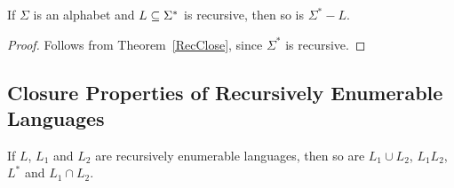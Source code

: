 \begin{corollary}
\label{RecComp}

If $\Sigma$ is an alphabet and $L\subseteq\Sigma^*$ is recursive,
then so is $\Sigma^*-L$.
\end{corollary}

\begin{proof}
Follows from Theorem~\ref{RecClose}, since $\Sigma^*$ is recursive.
\end{proof}

%

\subsection{Closure Properties of Recursively Enumerable Languages}

%

\begin{theorem}
If $L$, $L_1$ and $L_2$ are recursively enumerable languages, then so
are $L_1\cup L_2$, $L_1L_2$, $L^*$ and $L_1\cap L_2$.
\end{theorem}

